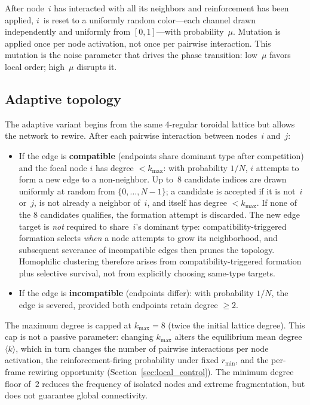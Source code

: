 \documentclass[preprint,12pt]{elsarticle}
\newcommand{\kavg}{\langle k \rangle} %
\newcommand{\rmin}{r_{\min}}           %
\newcommand{\kmax}{k_{\max}}           %
\begin{document}
After node~$i$ has interacted with all its neighbors and
reinforcement has been applied, $i$~is reset to a uniformly
random color---each channel drawn independently and uniformly
from $[0, 1]$---with probability~$\mu$.
Mutation is applied once per node activation, not once per
pairwise interaction.
This mutation is the noise parameter that drives the
phase transition: low~$\mu$ favors local order;
high~$\mu$ disrupts it.

\subsection{Adaptive topology}

The adaptive variant begins from the same 4-regular toroidal
lattice but allows the network to rewire.
After each pairwise interaction between nodes~$i$ and~$j$:
\begin{itemize}
  \item If the edge is \textbf{compatible} (endpoints share
        dominant type after competition) and the focal node $i$
        has degree $< \kmax$: with probability $1/N$, $i$ attempts
        to form a new edge to a non-neighbor.
        Up to~8 candidate indices are drawn uniformly at random
        from $\{0, \ldots, N{-}1\}$; a candidate is accepted if
        it is not~$i$ or~$j$, is not already a neighbor of~$i$,
        and itself has degree $< \kmax$.
        If none of the 8 candidates qualifies, the formation
        attempt is discarded.
        The new edge target is \emph{not} required to share~$i$'s
        dominant type: compatibility-triggered formation selects
        \emph{when} a node attempts to grow its neighborhood, and
        subsequent severance of incompatible edges then prunes
        the topology.
        Homophilic clustering therefore arises from
        compatibility-triggered formation plus selective survival,
        not from explicitly choosing same-type targets.
  \item If the edge is \textbf{incompatible} (endpoints differ):
        with probability $1/N$, the edge is severed, provided
        both endpoints retain degree $\geq 2$.
\end{itemize}
The maximum degree is capped at $\kmax = 8$ (twice the initial
lattice degree).
This cap is not a passive parameter: changing $\kmax$ alters
the equilibrium mean degree $\kavg$, which in turn changes the
number of pairwise interactions per node activation, the
reinforcement-firing probability under fixed $\rmin$, and the
per-frame rewiring opportunity (Section~\ref{sec:local_control}).
The minimum degree floor of~$2$ reduces the frequency of
isolated nodes and extreme fragmentation, but does not
guarantee global connectivity.
\end{document}
